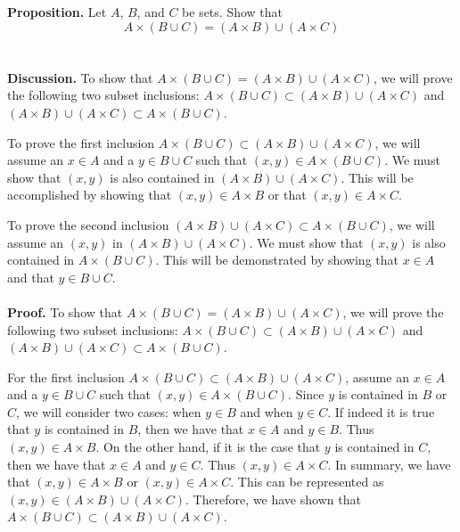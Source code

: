 \documentclass[12pt]{exam}
\begin{document}
\begin{questions}
\question
\textbf{Proposition.}  Let $A$, $B$, and $C$ be sets. Show that
\begin{equation*}
A \times (B \cup C) = (A \times B) \cup (A \times C)
\end{equation*}
\\
\\\textbf{Discussion.} To show that $A \times (B \cup C) = (A \times B) \cup (A \times C)$, we will prove the following two subset inclusions: $A \times (B \cup C) \subset (A \times B) \cup (A \times C)$ and $(A \times B) \cup (A \times C) \subset A \times (B \cup C)$. 
\par
To prove the first inclusion $A \times (B \cup C) \subset (A \times B) \cup (A \times C)$, we will assume an $x \in A$ and a $y \in B \cup C$ such that $(x, y) \in A \times (B \cup C)$. We must show that $(x,y)$ is also contained in $(A \times B) \cup (A \times C)$. This will be accomplished by showing that $(x, y) \in A \times B$ or that $(x, y) \in A \times C$.
\par
To prove the second inclusion $(A \times B) \cup (A \times C) \subset A \times (B \cup C)$, we will assume an $(x, y)$ in $(A \times B) \cup (A \times C)$. We must show that $(x, y)$ is also contained in $A \times (B \cup C)$. This will be demonstrated by showing that $x \in A$ and that $y \in B \cup C$.
\\
\\\textbf{Proof.} To show that $A \times (B \cup C) = (A \times B) \cup (A \times C)$, we will prove the following two subset inclusions: $A \times (B \cup C) \subset (A \times B) \cup (A \times C)$ and $(A \times B) \cup (A \times C) \subset A \times (B \cup C)$. 
\par
For the first inclusion $A \times (B \cup C) \subset (A \times B) \cup (A \times C)$, assume an $x \in A$ and a $y \in B \cup C$ such that $(x, y) \in A \times (B \cup C)$. Since $y$ is contained in $B$ or $C$, we will consider two cases: when $y \in B$ and when $y \in C$. If indeed it is true that $y$ is contained in $B$, then we have that $x \in A$ and $y \in B$. Thus $(x, y) \in A \times B$. On the other hand, if it is the case that $y$ is contained in $C$, then we have that $x \in A$ and $y \in C$. Thus $(x, y) \in A \times C$. In summary, we have that $(x, y) \in A \times B$ or $(x, y) \in A \times C$. This can be represented as $(x,y) \in (A \times B) \cup (A \times C)$. Therefore, we have shown that $A \times (B \cup C) \subset (A \times B) \cup (A \times C)$.
\par

\end{questions}
\end{document}
